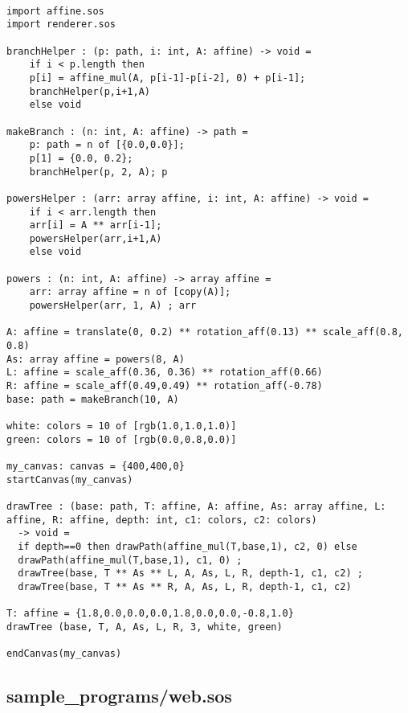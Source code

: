 \documentclass[main.tex]{subfiles}
\begin{document}
\begin{lstlisting}

import affine.sos
import renderer.sos

branchHelper : (p: path, i: int, A: affine) -> void = 
    if i < p.length then
    p[i] = affine_mul(A, p[i-1]-p[i-2], 0) + p[i-1];
    branchHelper(p,i+1,A)
    else void

makeBranch : (n: int, A: affine) -> path =
    p: path = n of [{0.0,0.0}];
    p[1] = {0.0, 0.2};
    branchHelper(p, 2, A); p

powersHelper : (arr: array affine, i: int, A: affine) -> void = 
    if i < arr.length then
    arr[i] = A ** arr[i-1];
    powersHelper(arr,i+1,A)
    else void

powers : (n: int, A: affine) -> array affine = 
    arr: array affine = n of [copy(A)];
    powersHelper(arr, 1, A) ; arr

A: affine = translate(0, 0.2) ** rotation_aff(0.13) ** scale_aff(0.8, 0.8)
As: array affine = powers(8, A)
L: affine = scale_aff(0.36, 0.36) ** rotation_aff(0.66)
R: affine = scale_aff(0.49,0.49) ** rotation_aff(-0.78)
base: path = makeBranch(10, A)

white: colors = 10 of [rgb(1.0,1.0,1.0)]
green: colors = 10 of [rgb(0.0,0.8,0.0)]

my_canvas: canvas = {400,400,0}
startCanvas(my_canvas)

drawTree : (base: path, T: affine, A: affine, As: array affine, L: affine, R: affine, depth: int, c1: colors, c2: colors)
  -> void = 
  if depth==0 then drawPath(affine_mul(T,base,1), c2, 0) else
  drawPath(affine_mul(T,base,1), c1, 0) ;
  drawTree(base, T ** As ** L, A, As, L, R, depth-1, c1, c2) ;
  drawTree(base, T ** As ** R, A, As, L, R, depth-1, c1, c2)

T: affine = {1.8,0.0,0.0,0.0,1.8,0.0,0.0,-0.8,1.0}
drawTree (base, T, A, As, L, R, 3, white, green)

endCanvas(my_canvas)

\end{lstlisting}

\subsection{sample\_programs/web.sos}
\end{document}
